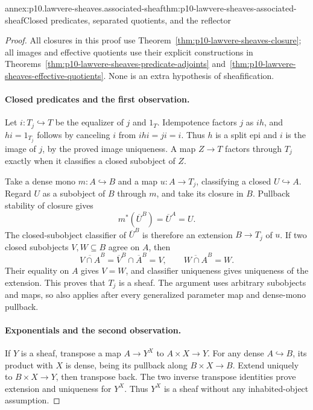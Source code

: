 \begin{annexitem}{annex:p10.lawvere-sheaves.associated-sheaf}{thm:p10-lawvere-sheaves-associated-sheaf}{Closed predicates, separated quotients, and the reflector}
\begin{proof}
All closures in this proof use
Theorem~\ref{thm:p10-lawvere-sheaves-closure}; all images and
effective quotients use their explicit constructions in
Theorems~\ref{thm:p10-lawvere-sheaves-predicate-adjoints}
and~\ref{thm:p10-lawvere-sheaves-effective-quotients}.
None is an extra hypothesis of sheafification.

\paragraph{Closed predicates and the first observation.}
Let \(i:T_j\hookrightarrow T\) be the equalizer of
\(j\) and \(1_T\).  Idempotence factors \(j\) as
\(i h\), and \(h i=1_{T_j}\) follows by canceling
\(i\) from \(i h i=j i=i\).  Thus \(h\) is a split
epi and \(i\) is the image of \(j\), by the proved
image uniqueness.  A map \(Z\to T\) factors through
\(T_j\) exactly when it classifies a closed subobject
of \(Z\).

Take a dense mono \(m:A\hookrightarrow B\) and a map
\(u:A\to T_j\), classifying a closed
\(U\hookrightarrow A\).  Regard \(U\) as a subobject
of \(B\) through \(m\), and take its closure in \(B\).
Pullback stability of closure gives
\[
              m^*(\overline U^{B})=\overline U^{A}=U.
\]
The closed-subobject classifier of \(\overline U^{B}\)
is therefore an extension \(B\to T_j\) of \(u\).
If two closed subobjects \(V,W\subseteq B\) agree
on \(A\), then
\[
 \overline{V\cap A}^{B}
      =\overline V^{B}\cap\overline A^{B}=V,
 \qquad
 \overline{W\cap A}^{B}=W.
\]
Their equality on \(A\) gives \(V=W\), and classifier
uniqueness gives uniqueness of the extension.  This proves
that \(T_j\) is a sheaf.  The argument uses arbitrary
subobjects and maps, so also applies after every generalized
parameter map and dense-mono pullback.

\paragraph{Exponentials and the second observation.}
If \(Y\) is a sheaf, transpose a map \(A\to Y^X\)
to \(A\times X\to Y\).  For any dense
\(A\hookrightarrow B\), its product with \(X\)
is dense, being its pullback along \(B\times X\to B\).
Extend uniquely to \(B\times X\to Y\), then transpose
back.  The two inverse transpose identities prove extension
and uniqueness for \(Y^X\).  Thus \(Y^X\) is a sheaf
without any inhabited-object assumption.


\end{proof}
\end{annexitem}
